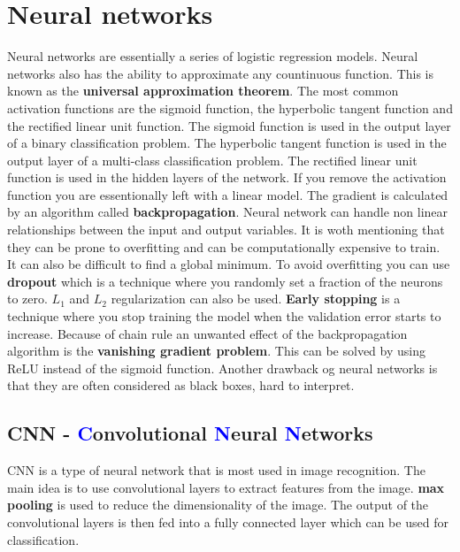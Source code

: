 \section{Neural networks}
Neural networks are essentially a series of logistic regression models. Neural networks also has the ability to approximate any countinuous function. This is known as the \textbf{universal approximation theorem}. The most common activation functions are the sigmoid function, the hyperbolic tangent function and the rectified linear unit function. The sigmoid function is used in the output layer of a binary classification problem. The hyperbolic tangent function is used in the output layer of a multi-class classification problem. The rectified linear unit function is used in the hidden layers of the network. If you remove the activation function you are essentionally left with a linear model. \newline
The gradient is calculated by an algorithm called \textbf{backpropagation}. Neural network can handle non linear relationships between the input and output variables. It is woth mentioning that  they can be prone to overfitting and can be computationally expensive to train. It can also be difficult to find a global minimum. \newline
To avoid overfitting you can use \textbf{dropout} which is a technique where you randomly set a fraction of the neurons to zero. $L_1$ and $L_2$ regularization can also be used. \newline
\textbf{Early stopping} is a technique where you stop training the model when the validation error starts to increase. \newline
Because of chain rule an unwanted effect of the backpropagation algorithm is the \textbf{vanishing gradient problem}. This can be solved by using ReLU instead of the sigmoid function. \newline
Another drawback og neural networks is that they are often considered as black boxes, hard to interpret.

\subsection{CNN - \textcolor{blue}{C}onvolutional \textcolor{blue}{N}eural \textcolor{blue}{N}etworks}
CNN is a type of neural network that is most used in image recognition. The main idea is to use convolutional layers to extract features from the image. \textbf{max pooling} is used to reduce the dimensionality of the image. The output of the convolutional layers is then fed into a fully connected layer which can be used for classification. \newline

